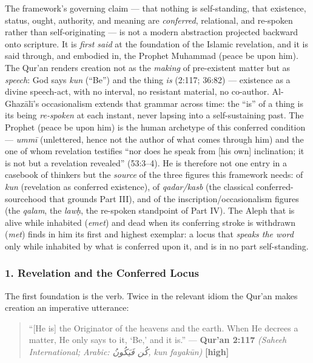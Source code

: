 \documentclass[11pt]{article}
\newcommand{\AR}[1]{{\arabicfont\beginR #1\endR}}
\begin{document}
The framework's governing claim — that nothing is self-standing, that existence, status, ought, authority, and meaning are \emph{conferred}, relational, and re-spoken rather than self-originating — is not a modern abstraction projected backward onto scripture. It is \emph{first said} at the foundation of the Islamic revelation, and it is said through, and embodied in, the Prophet Muhammad (peace be upon him). The Qur'an renders creation not as the \emph{making} of pre-existent matter but as \emph{speech}: God says \emph{kun} (``Be'') and the thing \emph{is} (2:117; 36:82) — existence as a divine speech-act, with no interval, no resistant material, no co-author. Al-Ghazālī's occasionalism extends that grammar across time: the ``is'' of a thing is its being \emph{re-spoken} at each instant, never lapsing into a self-sustaining past. The Prophet (peace be upon him) is the human archetype of this conferred condition — \emph{ummī} (unlettered, hence not the author of what comes through him) and the one of whom revelation testifies ``nor does he speak from [his own] inclination; it is not but a revelation revealed'' (53:3–4). He is therefore not one entry in a casebook of thinkers but the \emph{source} of the three figures this framework needs: of \emph{kun} (revelation as conferred existence), of \emph{qadar/\allowbreak{}kasb} (the classical conferred-sourcehood that grounds Part III), and of the inscription/\allowbreak{}occasionalism figures (the \emph{qalam}, the \emph{lawḥ}, the re-spoken standpoint of Part IV). The Aleph that is alive while inhabited (\emph{emet}) and dead when its conferring stroke is withdrawn (\emph{met}) finds in him its first and highest exemplar: a locus that \emph{speaks the word} only while inhabited by what is conferred upon it, and is in no part self-standing.

\subsubsection*{1. Revelation and the Conferred Locus}

The first foundation is the verb. Twice in the relevant idiom the Qur'an makes creation an imperative utterance:

\begin{quote}
``[He is] the Originator of the heavens and the earth. When He decrees a matter, He only says to it, `Be,' and it is.'' — \textbf{Qur'an 2:117} \emph{(Saheeh International; Arabic: \AR{كُن فَيَكُونُ}, kun fayakūn)} \textbf{[high]}
\end{quote}
\end{document}
